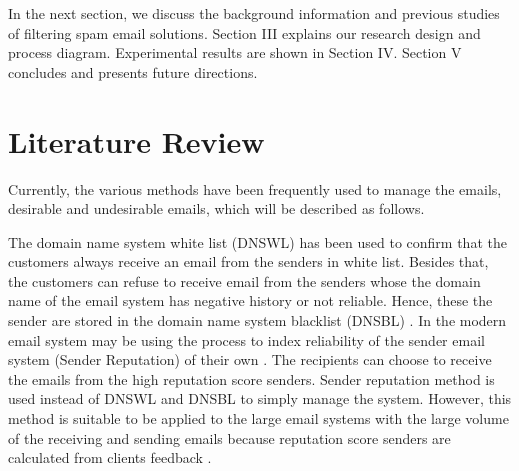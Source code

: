 \documentclass[conference]{IEEEtran}
\begin{document}
In the next section, we discuss the background information and previous studies of filtering spam email solutions. 
%
Section III explains our research design and process diagram. 
%
Experimental results are shown in Section IV.
%
Section V concludes and presents future directions.
%
\section{Literature Review}
Currently, the various methods \cite{levine, Sochor, Lazzari, DBLP:taylor, wong, NguyenTuanAnh, Seike, crocker, Leiba, Higashikado, upasana, XiaoJunyong, falk, FalkKucherawy, gmail} have been frequently used to manage the emails, desirable and undesirable emails, which will be described as follows.

The domain name system white list (DNSWL) \cite{levine} has been used to confirm that the customers always receive an email from the senders in white list.
%
Besides that, the customers can refuse to receive email from the senders whose the domain name of the email system has negative history or not reliable. 
%
Hence, these the sender are stored in the domain name system blacklist (DNSBL) \cite{levine,Sochor,Lazzari}.
%
In the modern email system may be using the process to index reliability of the sender email system (Sender Reputation) of their own \cite{DBLP:taylor}. 
%
The recipients can choose to receive the emails from the high reputation score senders.
%
Sender reputation method is used instead of DNSWL and DNSBL to simply manage the system.
%
However, this method is suitable to be applied to the large email systems with the large volume of the receiving and sending emails because reputation score senders are calculated from clients feedback .
\end{document}
